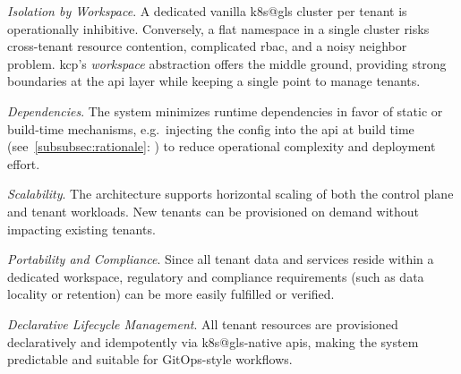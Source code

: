 \documentclass[11pt, a4paper, oneside, listof=totoc]{scrartcl}
\newcommand{\see}[1]{(see~\autoref{#1}: \textit{\nameref{#1}})}
\begin{document}
                \begin{enumerate}[label={[\arabic*]:},
                    ref=Challenge~\arabic*,
                    leftmargin=*,
                    itemsep=0.6\baselineskip]

                    \item\label{chal:isolationByWorkspace}
                        \textit{Isolation by Workspace}.
                        A dedicated vanilla \gls{k8s@gls} cluster per tenant is operationally
                        inhibitive.
                        Conversely, a flat namespace in a single cluster risks cross-tenant resource
                        contention, complicated \gls{rbac}, and a noisy neighbor problem.
                        \gls{kcp}'s \textit{workspace} abstraction offers the middle ground,
                        providing strong boundaries at the \gls{api} layer while keeping a single
                        point to manage tenants.

                    \item\label{chal:dependencies}
                        \textit{Dependencies}.
                        The system minimizes runtime dependencies in favor of static or build-time
                        mechanisms, e.g.\ injecting the config into the \gls{api} at build time
                        \see{subsubsec:rationale} to reduce operational complexity and deployment
                        effort.

                    \item\label{chal:scalabilitySupport}
                        \textit{Scalability}.
                        The architecture supports horizontal scaling of both the control plane and
                        tenant workloads.
                        New tenants can be provisioned on demand without impacting existing tenants.

                    \item\label{chal:portabilityAndCompliance}
                        \textit{Portability and Compliance}.
                        Since all tenant data and services reside within a dedicated workspace,
                        regulatory and compliance requirements (such as data locality or retention)
                        can be more easily fulfilled or verified.

                    \item\label{chal:declarativeLifecycle}
                        \textit{Declarative Lifecycle Management}.
                        All tenant resources are provisioned declaratively and idempotently via
                        \gls{k8s@gls}-native \glspl{api}, making the system predictable and suitable
                        for GitOps-style workflows.


\end{enumerate}
\end{document}
